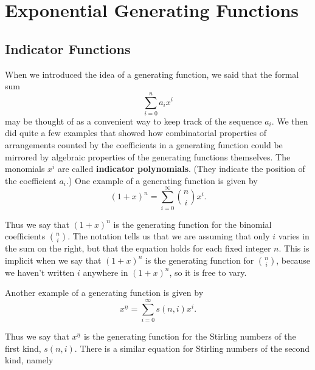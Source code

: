 \documentclass[10pt,]{book}
\newcommand{\terminology}[1]{\textbf{#1}}
\theoremstyle{plain}
\theoremstyle{definition}
\theoremstyle{definition}
\numberwithin{equation}{chapter}
\begin{document}
\typeout{************************************************}
\typeout{************************************************}
\chapter[{Exponential Generating Functions}]{Exponential Generating Functions}\label{expogenfun}
\typeout{************************************************}
\typeout{************************************************}
\section[{Indicator Functions}]{Indicator Functions}\label{app3-1-indicator}
When we introduced the idea of a generating function, we said that the formal sum%
\begin{equation*}
\sum_{i=0}^n a_ix^i
\end{equation*}
may be thought of as a convenient way to keep track of the sequence \(a_i\). We then did quite a few examples that showed how combinatorial properties of arrangements counted by the coefficients in a generating function could be mirrored by algebraic properties of the generating functions themselves. The monomials \(x^i\) are called \terminology{indicator polynomials}. (They indicate the position of the coefficient \(a_i\).) One example of a generating function is given by%
\begin{equation*}
(1+x)^n = \sum_{i=0}^\infty \binom{n}{i}x^i.
\end{equation*}
%
\par
Thus we say that \((1+x)^n\) is the generating function for the binomial coefficients \(\binom{n}{i}\). The notation tells us that we are assuming that only \(i\) varies in the sum on the right, but that the equation holds for each fixed integer \(n\). This is implicit when we say that \((1+x)^n\) is the generating function for \(\binom{n}{i}\), because we haven't written \(i\) anywhere in \((1+x)^n\), so it is free to vary.%
\par
Another example of a generating function is given by%
\begin{equation*}
x^{\underline{n}} = \sum_{i=0}^\infty s(n,i)x^i.
\end{equation*}
%
\par
Thus we say that \(x^{\underline{n}}\) is the generating function for the Stirling numbers of the first kind, \(s(n,i)\). There is a similar equation for Stirling numbers of the second kind, namely%
\end{document}
